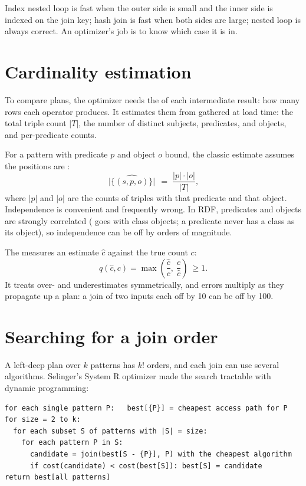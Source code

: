 \begin{keyidea}
Index nested loop is fast when the outer side is small and the inner side is
indexed on the join key; hash join is fast when both sides are large; nested
loop is always correct. An optimizer's job is to know which case it is in.
\end{keyidea}

\section{Cardinality estimation}

To compare plans, the optimizer needs the  of each
intermediate result: how many rows each operator produces. It estimates them
from  gathered at load time: the total triple count $|T|$,
the number of distinct subjects, predicates, and objects, and per-predicate
counts.

For a pattern with predicate $p$ and object $o$ bound, the classic estimate
assumes the positions are :
\[
  \widehat{\,|\{(s,p,o)\}|\,} \;=\; \frac{|p| \cdot |o|}{|T|},
\]
where $|p|$ and $|o|$ are the counts of triples with that predicate and that
object. Independence is convenient and frequently wrong. In RDF, predicates and
objects are strongly correlated ( goes with class objects; a
 predicate never has a class as its object), so independence can be
off by orders of magnitude.

The  measures an estimate $\hat c$ against the true count $c$:
\[
  q(\hat c, c) = \max\!\left(\frac{\hat c}{c},\ \frac{c}{\hat c}\right) \ \ge 1 .
\]
It treats over- and underestimates symmetrically, and errors multiply as they
propagate up a plan: a join of two inputs each off by 10 can be off by 100.

\section{Searching for a join order}

A left-deep plan over $k$ patterns has $k!$ orders, and each join can use
several algorithms. Selinger's System R optimizer \cite{selinger} made the
search tractable with dynamic programming:

\begin{lstlisting}[language=pseudo]
for each single pattern P:   best[{P}] = cheapest access path for P
for size = 2 to k:
  for each subset S of patterns with |S| = size:
    for each pattern P in S:
      candidate = join(best[S - {P}], P) with the cheapest algorithm
      if cost(candidate) < cost(best[S]): best[S] = candidate
return best[all patterns]
\end{lstlisting}


